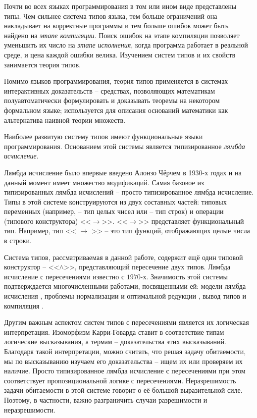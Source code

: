 \documentclass[../main.tex]{subfiles}
\begin{document}
 \label{sec:introduction}

Почти во всех языках программирования в том или ином виде представлены типы. Чем сильнее система типов языка, тем больше ограничений она накладывает на корректные программы и тем больше ошибок может быть найдено на {\it этапе компиляции}. Поиск ошибок на этапе компиляции позволяет уменьшить их число на {\it этапе исполнения}, когда программа работает в реальной среде, и цена каждой ошибки велика. Изучением систем типов и их свойств занимается теория типов. 

Помимо языков программирования, теория типов применяется в системах интерактивных доказательств -- средствах, позволяющих математикам полуавтоматически формулировать и доказывать теоремы на некотором формальном языке; используется для описания оснований математики как альтернатива наивной теории множеств.

\emptyline

Наиболее развитую систему типов имеют функциональные языки программирования. Основанием этой системы является типизированное {\it лямбда исчисление}.

Лямбда исчисление было впервые введено Алонзо Чёрчем в 1930-х годах и на данный момент имеет множество модификаций. Самая базовое из типизированных лямбда исчислений -- просто типизированное лямбда исчисление. Типы в этой системе конструируются из двух составных частей: типовых переменных (например,  -- тип целых чисел или  -- тип строк) и операции (типового конструктора) <<$\to$>>. <<$\to$>> представляет функциональный тип. Например, тип << $\to$ >> -- это тип функций, отображающих целые числа в строки. 

Система типов, рассматриваемая в данной работе, содержит ещё один типовой конструктор -- <<$\wedge$>>, представляющий пересечение двух типов. Лямбда исчисление с пересечениями известно с $1970$-х. Значимость этой системы подтверждается многочисленными работами, посвященными ей: модели лямбда исчисления \cite{alessi_2006, coppo_1980}, проблемы нормализации и оптимальной редукции \cite{neergaard_2004, pottinger_1980}, вывод типов и компиляция \cite{kfoury_2004, wells_2002}.

Другим важным аспектом систем типов с пересечениями является их логическая интерпретация. Изоморфизм Карри-Говарда ставит в соответствие типам логические высказывания, а термам -- доказательства этих высказываний. 
Благодаря такой интерпретации, можно считать, что решая задачу обитаемости, мы по высказыванию изучаем его доказательства -- ищем их или проверяем их наличие.
Просто типизированное лямбда исчисление с пересечениями при этом соответствует пропозициональной логике с пересечениями. Неразрешимость задачи обитаемости в этой системе \cite{urzyczyn_1999} говорит о её большой выразительной силе. Поэтому, в частности, важно разграничить случаи разрешимости и неразрешимости. 
\end{document}
